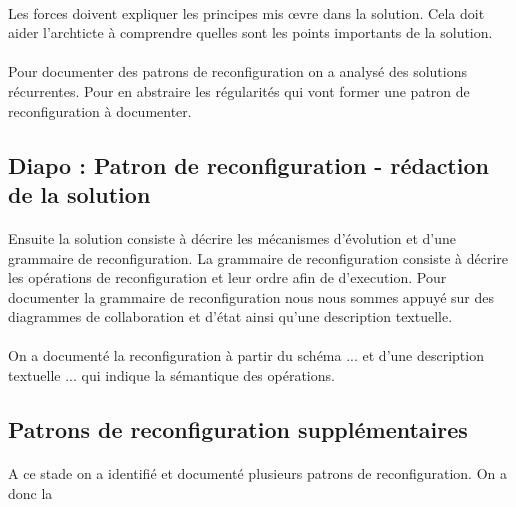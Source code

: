 \paragraph{}
Les forces doivent expliquer les principes mis \oe{}vre dans la
solution. Cela doit aider l'archticte à comprendre quelles sont les
points importants de la solution.  

\paragraph{}
Pour documenter des patrons de reconfiguration on a analysé des solutions
récurrentes. Pour en abstraire les régularités qui vont former une
patron de reconfiguration à documenter. 

\subsection{Diapo : Patron de reconfiguration - rédaction de la solution}

\paragraph{}
Ensuite la solution consiste à décrire les mécanismes d'évolution
et d'une grammaire de reconfiguration. La grammaire de reconfiguration
consiste à  décrire les opérations de reconfiguration et leur ordre
afin de d'execution. Pour documenter la grammaire de reconfiguration
nous nous sommes appuyé sur des diagrammes de collaboration et d'état
ainsi qu'une description textuelle. 
 
\paragraph{}
On a documenté la reconfiguration à partir du schéma ... 
et d'une description textuelle ... qui indique la sémantique des
opérations. 


\subsection{Patrons de reconfiguration supplémentaires} 

\paragraph{}
A ce stade on a identifié et documenté plusieurs patrons de
reconfiguration. On a donc la 

